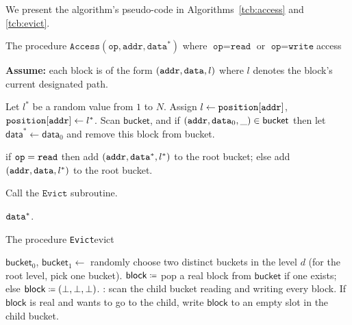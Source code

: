 We present the algorithm's pseudo-code in Algorithms~\ref{tcb:access}
and \ref{tcb:evict}.

\begin{algo}{The procedure $\texttt{Access}(\texttt{op}, \texttt{addr}, \texttt{data}^*)$ where $\texttt{op} = \texttt{read}$ or $\texttt{op} = \texttt{write}$}{access}

\textbf{Assume:}
each block is of the form $({\texttt{addr}}, {\texttt{data}}, l)$
where $l$ denotes the block's current designated path.

\begin{algorithmic}[1]
\STATE Let $l^{*}$ be a random value from $1$ to $N$.
Assign $l \leftarrow \texttt{position}[{\texttt{addr}}]$, $\texttt{position}[{\texttt{addr}}] \leftarrow l^{*}$.
	\STATE Scan $\textsf{bucket}$, and if
$({\texttt{addr}}, {\texttt{data}}_0, \_) \in \textsf{bucket}$ then
let $\textsf{data}^* \leftarrow \textsf{data}_0$ and
remove this block from \textsf{bucket}.
\ENDFOR

\STATE if ${\texttt{op}} = \texttt{read}$ then add $({\texttt{addr}}, {\texttt{data}}^*, l^*)$ to the root bucket;
else add $({\texttt{addr}}, {\texttt{data}}, l^*)$ to the root bucket.

\STATE Call the $\texttt{Evict}$ subroutine.

\RETURN ${\texttt{data}}^*$.

\end{algorithmic}
\end{algo}

\begin{algo}{The procedure \texttt{Evict}}{evict}
\begin{algorithmic}[1]

\STATE $\textsf{bucket}_0$, $\textsf{bucket}_1 \leftarrow$
randomly choose two distinct buckets in the level $d$
(for the root level, pick one bucket).
\STATE
$\textsf{block} \defeq$ pop a real block from $\textsf{bucket}$
if one exists; else $\textsf{block} \defeq (\bot, \bot, \bot)$.
:
scan the child bucket reading
and writing every block.
If $\textsf{block}$ is real and wants to go to
the child, write $\textsf{block}$  to an empty slot in the child bucket.
\ENDFOR
\ENDFOR
\end{algorithmic}
\end{algo}

